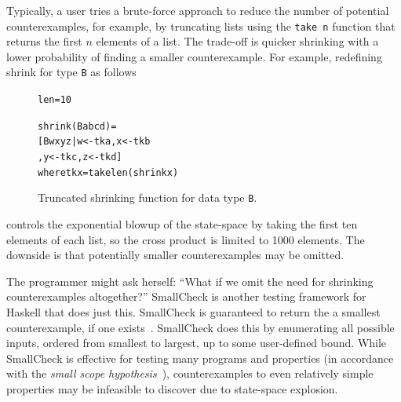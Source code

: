 \documentclass[10pt]{sigplanconf}
\newenvironment{code}{\begin{alltt}}{\end{alltt}}
\newcommand{\ttp}[1]{\texttt{#1}}
\begin{document}
Typically, a user tries a brute-force approach to reduce the number of potential
counterexamples, for example, by truncating lists using the \ttp{take n} function
that returns the first $n$ elements of a list.  The trade-off is quicker
shrinking with a lower probability of finding a smaller counterexample.  For
example, redefining shrink for type \ttp{B} as follows
%


\begin{figure}[ht]
\begin{code}
len = 10

shrink (B a b c d) =
  [ B w x y z | w <- tk a, x <- tk b
              , y <- tk c, z <- tk d ]
  where tk x = take len (shrink x)
\end{code}
  \caption{Truncated shrinking function for data type \ttp{B}.}
  \label{lst:newshrink}
\end{figure}

%
\noindent
controls the exponential blowup of the state-space by taking the first ten
elements of each list, so the cross product is limited to 1000 elements.  The
downside is that potentially smaller counterexamples may be omitted.

The programmer might ask herself: ``What if we omit the need for shrinking
counterexamples altogether?''  SmallCheck is another testing framework for
Haskell that does just this.  SmallCheck is guaranteed to return the a smallest
counterexample, if one exists~\cite{sc}.  SmallCheck does this by enumerating
all possible inputs, ordered from smallest to largest, up to some user-defined
bound.  While SmallCheck is effective for testing many programs and properties
(in accordance with the \emph{small scope hypothesis}~\cite{jackson}),
counterexamples to even relatively simple properties may be infeasible to
discover due to state-space explosion.
\end{document}

